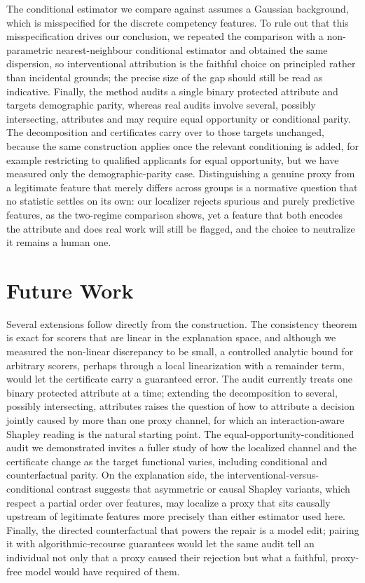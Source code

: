 \documentclass[sn-mathphys-num]{sn-jnl}
\begin{document}
The conditional estimator we compare against assumes a Gaussian background, which
is misspecified for the discrete competency features. To rule out that this
misspecification drives our conclusion, we repeated the comparison with a
non-parametric nearest-neighbour conditional estimator and obtained the same
dispersion, so interventional attribution is the faithful choice on principled
rather than incidental grounds; the precise size of the gap should still be read
as indicative. Finally, the method audits a single binary protected attribute and
targets demographic parity, whereas real audits involve several, possibly
intersecting, attributes and may require equal opportunity or conditional parity.
The decomposition and certificates carry over to those targets unchanged, because
the same construction applies once the relevant conditioning is added, for example
restricting to qualified applicants for equal opportunity, but we have measured
only the demographic-parity case. Distinguishing a genuine proxy from a legitimate
feature that merely differs across groups is a normative question that no statistic
settles on its own: our localizer rejects spurious and purely predictive features,
as the two-regime comparison shows, yet a feature that both encodes the attribute
and does real work will still be flagged, and the choice to neutralize it remains
a human one.

\section{Future Work}
\label{sec:future}
Several extensions follow directly from the construction. The consistency theorem
is exact for scorers that are linear in the explanation space, and although we
measured the non-linear discrepancy to be small, a controlled analytic bound for
arbitrary scorers, perhaps through a local linearization with a remainder term,
would let the certificate carry a guaranteed error. The audit currently treats one
binary protected attribute at a time; extending the decomposition to several,
possibly intersecting, attributes raises the question of how to attribute a
decision jointly caused by more than one proxy channel, for which an
interaction-aware Shapley reading is the natural starting point. The
equal-opportunity-conditioned audit we demonstrated invites a fuller study of how
the localized channel and the certificate change as the target functional varies,
including conditional and counterfactual parity. On the explanation side, the
interventional-versus-conditional contrast suggests that asymmetric or causal
Shapley variants, which respect a partial order over features, may localize a
proxy that sits causally upstream of legitimate features more precisely than
either estimator used here. Finally, the directed counterfactual that powers the
repair is a model edit; pairing it with algorithmic-recourse guarantees would let
the same audit tell an individual not only that a proxy caused their rejection but
what a faithful, proxy-free model would have required of them.
\end{document}
